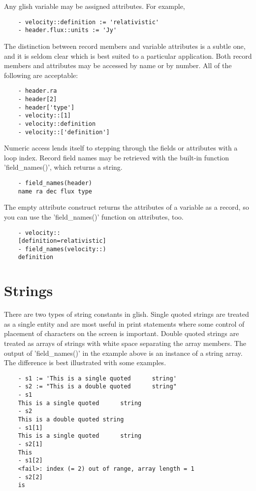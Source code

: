     Any glish variable may be assigned attributes.  For example,

\begin{verbatim}
	- velocity::definition := 'relativistic'
	- header.flux::units := 'Jy'
\end{verbatim}

The distinction between record members and variable attributes is a subtle
one, and it is seldom clear which is best suited to a particular
application.  Both record members and attributes may be accessed by name or
by number.  All of the following are acceptable:

\begin{verbatim}
	- header.ra
	- header[2]
	- header['type']
	- velocity::[1]
	- velocity::definition
	- velocity::['definition']
\end{verbatim}

Numeric access lends itself to stepping through the fields or attributes
with a loop index.  Record field names may be retrieved with the built-in
function 'field\_names()', which returns a string.

\begin{verbatim}
	- field_names(header)
	name ra dec flux type
\end{verbatim}

The empty attribute construct returns the attributes of a variable as a
record, so you can use the 'field\_names()' function on attributes, too.

\begin{verbatim}
	- velocity::
	[definition=relativistic]
	- field_names(velocity::)
	definition
\end{verbatim}


\section{Strings}

    There are two types of string constants in glish.  Single quoted
strings are treated as a single entity and are most useful in print
statements where some control of placement of characters on the screen is
important.  Double quoted strings are treated as arrays of strings with
white space separating the array members.  The output of 'field\_names()' in
the example above is an instance of a string array.  The difference is best
illustrated with some examples.

\begin{verbatim}
	- s1 := 'This is a single quoted      string'
	- s2 := "This is a double quoted      string"
	- s1
	This is a single quoted      string 
	- s2
	This is a double quoted string 
	- s1[1]
	This is a single quoted      string 
	- s2[1]
	This 
	- s1[2]
	<fail>: index (= 2) out of range, array length = 1 
	- s2[2]
	is 
\end{verbatim}

